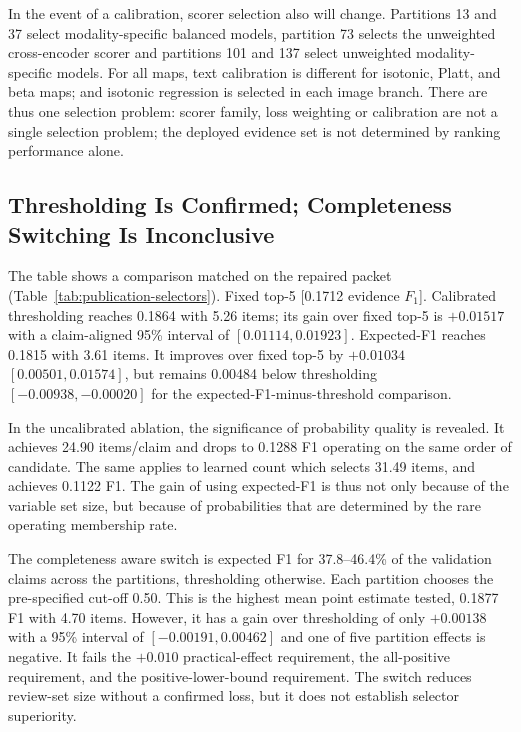In the event of a calibration, scorer selection also will change. Partitions 13 and 37 select modality-specific balanced models, partition 73 selects the unweighted cross-encoder scorer and partitions 101 and 137 select unweighted modality-specific models. For all maps, text calibration is different for isotonic, Platt, and beta maps; and isotonic regression is selected in each image branch. There are thus one selection problem: scorer family, loss weighting or calibration are not a single selection problem; the deployed evidence set is not determined by ranking performance alone.

\subsection{Thresholding Is Confirmed; Completeness Switching Is Inconclusive}

The table shows a comparison matched on the repaired packet (Table~\ref{tab:publication-selectors}). Fixed top-5 [0.1712 evidence $F_1$]. Calibrated thresholding reaches 0.1864 with 5.26 items; its gain over fixed top-5 is $+0.01517$ with a claim-aligned 95\% interval of $[0.01114,0.01923]$. Expected-F1 reaches 0.1815 with 3.61 items. It improves over fixed top-5 by $+0.01034$ $[0.00501,0.01574]$, but remains 0.00484 below thresholding $[-0.00938,-0.00020]$ for the expected-F1-minus-threshold comparison.



In the uncalibrated ablation, the significance of probability quality is revealed. It achieves 24.90 items/claim and drops to 0.1288 F1 operating on the same order of candidate. The same applies to learned count which selects 31.49 items, and achieves 0.1122 F1. The gain of using expected-F1 is thus not only because of the variable set size, but because of probabilities that are determined by the rare operating membership rate.

The completeness aware switch is expected F1 for 37.8--46.4\% of the validation claims across the partitions, thresholding otherwise. Each partition chooses the pre-specified cut-off 0.50. This is the highest mean point estimate tested, 0.1877 F1 with 4.70 items. However, it has a gain over thresholding of only $+0.00138$ with a 95\% interval of $[-0.00191,0.00462]$ and one of five partition effects is negative. It fails the $+0.010$ practical-effect requirement, the all-positive requirement, and the positive-lower-bound requirement. The switch reduces review-set size without a confirmed loss, but it does not establish selector superiority.

